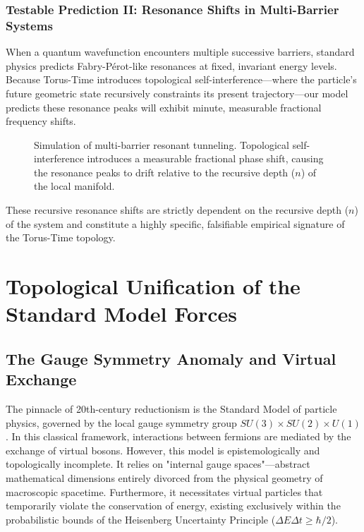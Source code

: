 \documentclass[12pt,openany]{book}
\begin{document}
\subsection{Testable Prediction II: Resonance Shifts in Multi-Barrier Systems}
When a quantum wavefunction encounters multiple successive barriers, standard physics predicts Fabry-P\'{e}rot-like resonances at fixed, invariant energy levels. Because Torus-Time introduces topological self-interference---where the particle's future geometric state recursively constraints its present trajectory---our model predicts these resonance peaks will exhibit minute, measurable fractional frequency shifts. 

\begin{figure}[h]
    \centering
    \caption{Simulation of multi-barrier resonant tunneling. Topological self-interference introduces a measurable fractional phase shift, causing the resonance peaks to drift relative to the recursive depth ($n$) of the local manifold.}
    \label{fig:resonance_shifts}
\end{figure}

These recursive resonance shifts are strictly dependent on the recursive depth ($n$) of the system and constitute a highly specific, falsifiable empirical signature of the Torus-Time topology.

\chapter{Topological Unification of the Standard Model Forces}

\section{The Gauge Symmetry Anomaly and Virtual Exchange}
The pinnacle of 20th-century reductionism is the Standard Model of particle physics, governed by the local gauge symmetry group $SU(3) \times SU(2) \times U(1)$. In this classical framework, interactions between fermions are mediated by the exchange of virtual bosons. However, this model is epistemologically and topologically incomplete. It relies on "internal gauge spaces"---abstract mathematical dimensions entirely divorced from the physical geometry of macroscopic spacetime. Furthermore, it necessitates virtual particles that temporarily violate the conservation of energy, existing exclusively within the probabilistic bounds of the Heisenberg Uncertainty Principle ($\Delta E \Delta t \ge \hbar/2$).
\end{document}
